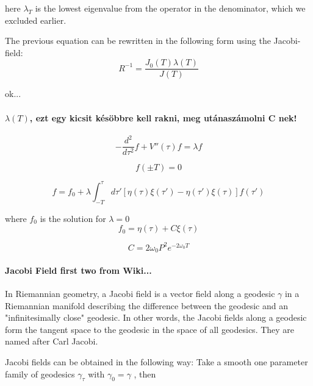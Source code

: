 \documentclass[12pt,a4paper]{article}
\numberwithin{equation}{section}
\begin{document}
here $\lambda_T$ is the lowest eigenvalue from the operator in the denominator, which we excluded earlier.

The previous equation can be rewritten in the following form using the Jacobi-field:
\begin{equation}
R^{-1} = \frac{J_0 (T) \lambda(T)}{J(T)}
\end{equation}

ok...

\paragraph{$\lambda  (T)$, ezt egy kicsit késöbbre kell rakni, meg utánaszámolni C nek!}

\begin{equation}
-\frac{d^2}{d\tau^2} f + V''(\tau) f = \lambda f
\end{equation}

\begin{equation}
f(\pm T) = 0
\end{equation}

\begin{equation}
f = f_0 + \lambda \int_{-T}^\tau d\tau' \left[ \eta(\tau) \xi(\tau') - \eta(\tau')\xi(\tau)\right] f(\tau')
\end{equation}

where $f_0$ is the solution for $\lambda = 0$
\begin{equation}
f_0 = \eta(\tau) + C\xi(\tau)
\end{equation}

\begin{equation}
C = 2 \omega_0 P^2 e^{-2\omega_0 T}
\end{equation}



\paragraph{Jacobi Field first two from Wiki...}
In Riemannian geometry, a Jacobi field is a vector field along a geodesic $\gamma$  in a Riemannian manifold describing the difference between the geodesic and an "infinitesimally close" geodesic. In other words, the Jacobi fields along a geodesic form the tangent space to the geodesic in the space of all geodesics. They are named after Carl Jacobi. 

Jacobi fields can be obtained in the following way: Take a smooth one parameter family of geodesics $\gamma _{\tau }$ with $\gamma _{0}=\gamma$ , then
\end{document}

